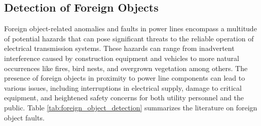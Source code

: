 \subsection{Detection of Foreign Objects}
Foreign object-related anomalies and faults in power lines encompass a multitude of potential hazards that can pose significant threats to the reliable operation of electrical transmission systems. 
These hazards can range from inadvertent interference caused by construction equipment and vehicles to more natural occurrences like fires, bird nests, and overgrown vegetation among others. 
The presence of foreign objects in proximity to power line components can lead to various issues, including interruptions in electrical supply, damage to critical equipment, and heightened safety concerns for both utility personnel and the public. Table \ref{tab:foreign_object_detection} summarizes the literature on foreign object faults.


